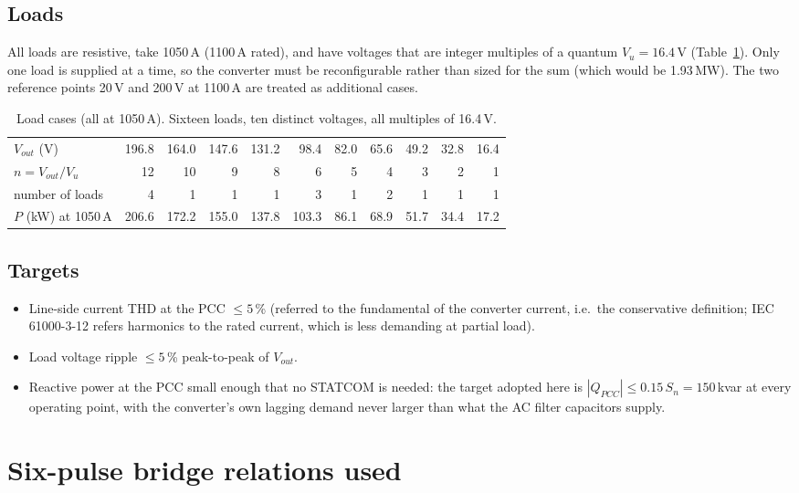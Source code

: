 \documentclass[11pt,a4paper]{article}
\begin{document}
\subsection{Loads}

All loads are resistive, take 1050\,A (1100\,A rated), and have voltages that are integer multiples of a quantum $V_u = 16.4$\,V (Table~\ref{tab:loads}). Only one load is supplied at a time, so the converter must be reconfigurable rather than sized for the sum (which would be 1.93\,MW). The two reference points 20\,V and 200\,V at 1100\,A are treated as additional cases.

\begin{table}[h]
\centering
\begin{tabular}{lrrrrrrrrrr}
\toprule
$V_{out}$ (V) & 196.8 & 164.0 & 147.6 & 131.2 & 98.4 & 82.0 & 65.6 & 49.2 & 32.8 & 16.4\\
$n = V_{out}/V_u$ & 12 & 10 & 9 & 8 & 6 & 5 & 4 & 3 & 2 & 1\\
number of loads & 4 & 1 & 1 & 1 & 3 & 1 & 2 & 1 & 1 & 1\\
$P$ (kW) at 1050\,A & 206.6 & 172.2 & 155.0 & 137.8 & 103.3 & 86.1 & 68.9 & 51.7 & 34.4 & 17.2\\
\bottomrule
\end{tabular}
\caption{Load cases (all at 1050\,A). Sixteen loads, ten distinct voltages, all multiples of 16.4\,V.}
\label{tab:loads}
\end{table}

\subsection{Targets}
\begin{itemize}
\item Line-side current THD at the PCC $\le 5$\,\% (referred to the fundamental of the converter current, i.e.\ the conservative definition; IEC\,61000-3-12 refers harmonics to the rated current, which is less demanding at partial load).
\item Load voltage ripple $\le 5$\,\% peak-to-peak of $V_{out}$.
\item Reactive power at the PCC small enough that no STATCOM is needed: the target adopted here is $|Q_{PCC}| \le 0.15\,S_n = 150$\,kvar at every operating point, with the converter's own lagging demand never larger than what the AC filter capacitors supply.
\end{itemize}

\section{Six-pulse bridge relations used}
\label{sec:basics}
\end{document}
